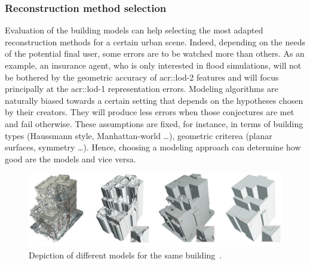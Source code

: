         \subsubsection{Reconstruction method selection}
            Evaluation of the building models can help selecting the most adapted reconstruction methods for a certain urban scene.
            Indeed, depending on the needs of the potential final user, some errors are to be watched more than others.
            As an example, an insurance agent, who is only interested in flood simulations, will not be bothered by the geometric accuracy of \gls{acr::lod}-2 features and will focus principally at the \gls{acr::lod}-1 representation errors.
            Modeling algorithms are naturally biased towards a certain setting that depends on the hypotheses chosen by their creators.
            They will produce less errors when those conjectures are met and fail otherwise.
            These assumptions are fixed, for instance, in terms of building types (Haussmann style, Manhattan-world \dots), geometric criterea (planar surfaces, symmetry \dots).
            Hence, choosing a modeling approach can determine how good are the models and vice versa.
            \begin{figure}[H]
                \centering
                \includegraphics[width=\textwidth]{images/introduction/use/comparison_li}
                \caption{\label{fig::comparison} Depiction of different models for the same building~\parencite{li2016manhattan}.}
            \end{figure}


